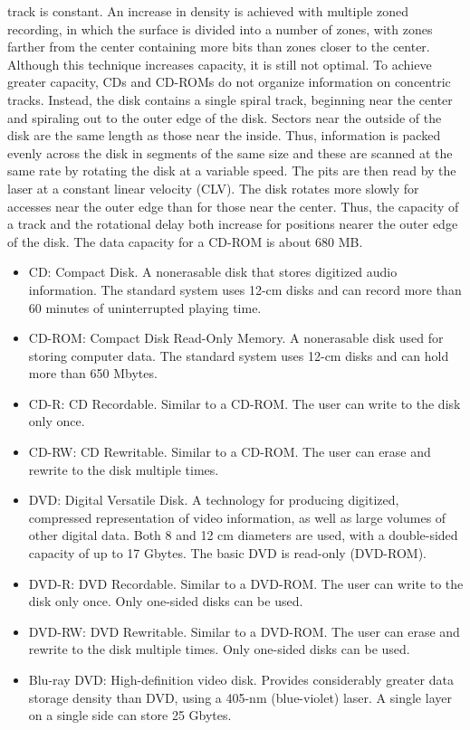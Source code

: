 track is constant. An increase in density is achieved with multiple zoned recording,
in which the surface is divided into a number of zones, with zones farther from the
center containing more bits than zones closer to the center. Although this technique
increases capacity, it is still not optimal.
To achieve greater capacity, CDs and CD-ROMs do not organize information
on concentric tracks. Instead, the disk contains a single spiral track, beginning near
the center and spiraling out to the outer edge of the disk. Sectors near the outside
of the disk are the same length as those near the inside. Thus, information is packed
evenly across the disk in segments of the same size and these are scanned at the
same rate by rotating the disk at a variable speed. The pits are then read by the laser
at a constant linear velocity (CLV). The disk rotates more slowly for accesses near
the outer edge than for those near the center. Thus, the capacity of a track and the
rotational delay both increase for positions nearer the outer edge of the disk. The
data capacity for a CD-ROM is about 680 MB.

\begin{itemize}
\item CD: Compact Disk. A nonerasable disk that stores digitized audio information. The standard system uses 12-cm disks and can record more than 60 minutes of uninterrupted playing time.
\item CD-ROM:  Compact Disk Read-Only Memory. A nonerasable disk used for storing computer data. The standard system uses 12-cm disks and can hold more than 650 Mbytes.
\item CD-R: CD Recordable. Similar to a CD-ROM. The user can write to the disk only once. 
\item CD-RW: CD Rewritable. Similar to a CD-ROM. The user can erase and rewrite to the disk multiple times.
\item DVD: Digital Versatile Disk. A technology for producing digitized, compressed representation of video information,
as well as large volumes of other digital data. Both 8 and 12 cm diameters are used, with a
double-sided capacity of up to 17 Gbytes. The basic DVD is read-only (DVD-ROM).
\item DVD-R: DVD Recordable. Similar to a DVD-ROM. The user can write to the disk only once. Only one-sided
disks can be used.
\item DVD-RW: DVD Rewritable. Similar to a DVD-ROM. The user can erase and rewrite to the disk multiple times.
Only one-sided disks can be used.
\item Blu-ray DVD: High-definition video disk. Provides considerably greater data storage density than DVD, using a 405-nm
(blue-violet) laser. A single layer on a single side can store 25 Gbytes.
\end{itemize}

